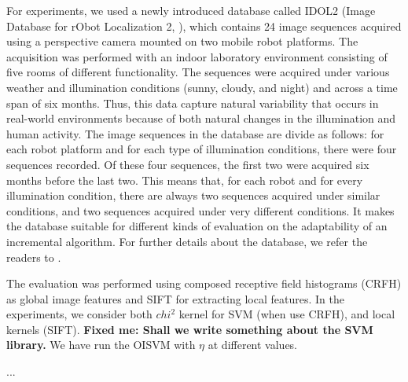 For experiments, we used a newly introduced database called IDOL2 (Image Database
for rObot Localization 2, \cite{luo:idol2}), which contains 24 image sequences acquired
using a perspective camera mounted on two mobile robot platforms. The acquisition was
performed with an indoor laboratory environment consisting of five rooms of different
functionality. The sequences were acquired under various weather and illumination conditions
(sunny, cloudy, and night) and across a time span of six months. Thus, this data capture
natural variability that occurs in real-world environments because of both natural changes
in the illumination and human activity. The image sequences in the database are divide as
follows: for each robot platform and for each type of illumination conditions, there were
four sequences recorded. Of these four sequences, the first two were acquired six months
before the last two. This means that, for each robot and for every illumination condition,
there are always two sequences acquired under similar conditions, and two sequences acquired
under very different conditions. It makes the database suitable for different kinds of evaluation
on the adaptability of an incremental algorithm. For further details about the database, we
refer the readers to \cite{luo:idol2}.

The evaluation was performed using composed receptive field histograms (CRFH)
\cite{Linde:Lindeberg:ICPR04} as global image features and SIFT \cite{lowe99object}
for extracting local features. In the experiments, we consider
both $chi^2$ kernel for SVM (when use CRFH), and local kernels \cite{wallraven:iccv03} (SIFT).
\textbf{Fixed me: Shall we write something about the SVM library.} We have run the OISVM with
$\eta$ at different values. 

...